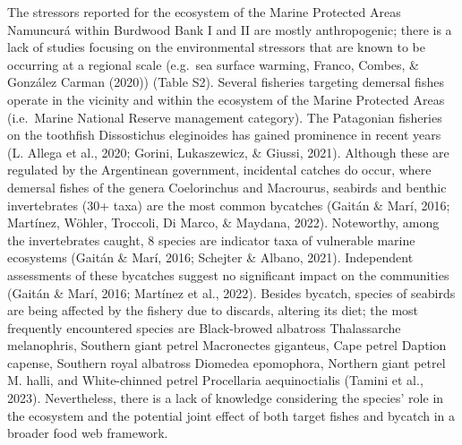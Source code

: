 \documentclass[
]{article}
\begin{document}
The stressors reported for the ecosystem of the Marine Protected Areas
Namuncurá within Burdwood Bank I and II are mostly anthropogenic; there
is a lack of studies focusing on the environmental stressors that are
known to be occurring at a regional scale (e.g.~sea surface warming,
Franco, Combes, \& González Carman (2020)) (Table S2). Several fisheries
targeting demersal fishes operate in the vicinity and within the
ecosystem of the Marine Protected Areas (i.e.~Marine National Reserve
management category). The Patagonian fisheries on the toothfish
Dissostichus eleginoides has gained prominence in recent years (L.
Allega et al., 2020; Gorini, Lukaszewicz, \& Giussi, 2021). Although
these are regulated by the Argentinean government, incidental catches do
occur, where demersal fishes of the genera Coelorinchus and Macrourus,
seabirds and benthic invertebrates (30+ taxa) are the most common
bycatches (Gaitán \& Marí, 2016; Martínez, Wöhler, Troccoli, Di Marco,
\& Maydana, 2022). Noteworthy, among the invertebrates caught, 8 species
are indicator taxa of vulnerable marine ecosystems (Gaitán \& Marí,
2016; Schejter \& Albano, 2021). Independent assessments of these
bycatches suggest no significant impact on the communities (Gaitán \&
Marí, 2016; Martínez et al., 2022). Besides bycatch, species of seabirds
are being affected by the fishery due to discards, altering its diet;
the most frequently encountered species are Black-browed albatross
Thalassarche melanophris, Southern giant petrel Macronectes giganteus,
Cape petrel Daption capense, Southern royal albatross Diomedea
epomophora, Northern giant petrel M. halli, and White-chinned petrel
Procellaria aequinoctialis (Tamini et al., 2023). Nevertheless, there is
a lack of knowledge considering the species' role in the ecosystem and
the potential joint effect of both target fishes and bycatch in a
broader food web framework.
\end{document}
